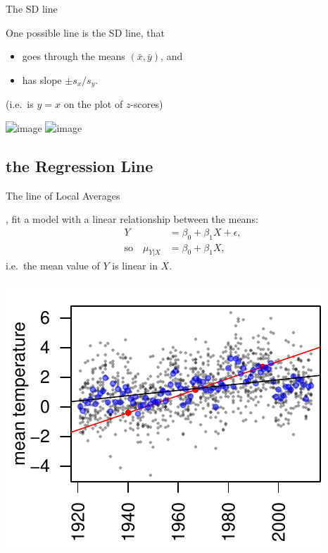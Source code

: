 \begin{frame}{The SD line}

    One possible line is the \alert{SD line},
    that
    \begin{itemize}
        \item goes through the means $(\bar x, \bar y)$, and
        \item has slope $\pm s_x/s_y$.
    \end{itemize}
    (i.e.\ is $y=x$ on the plot of $z$-scores)

    \vspace{1em}

     

    \centering
    \includegraphics<1>{usc-temps-lines}
    \includegraphics<2>{usc-temps-lines-means}

\end{frame}

\subsection{the Regression Line}

\begin{frame}{The line of Local Averages}

    , fit a model with a \alert{linear relationship between the means}:
    \begin{align*}
        Y &= \beta_0 + \beta_1 X + \epsilon, \\
        \text{so} \quad \mu_{Y|X} &= \beta_0 + \beta_1 X ,
    \end{align*}
    i.e.\ the mean value of $Y$ is linear in $X$.
    

    \begin{center}
        \includegraphics{usc-temps-both-lines}
    \end{center}

\end{frame}


